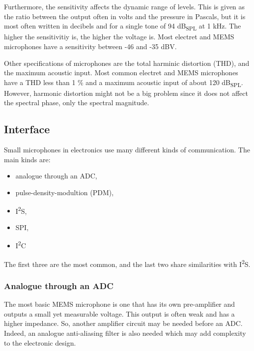 \documentclass[notitlepage]{report}
\begin{document}
Furthermore, the sensitivity affects the dynamic range of levels. This is given as the ratio between the output often in volts and the pressure in Pascals, but it is most often written in decibels and for a single tone of 94 \si{dB_{SPL}} at 1 \si{kHz}. The higher the sensitivitiy is, the higher the voltage is. Most electret and MEMS microphones have a sensitivity between -46 and -35 \si{dBV}.


Other specifications of microphones are the total harminic distortion (THD), and the maximum acoustic input. Most common electret and MEMS microphones have a THD  less than 1 \% and a maximum acoustic input of about 120 \si{dB_{SPL}}. However, harmonic distortion might not be a big problem since it does not affect the spectral phase, only the spectral magnitude.

\subsection{Interface}

Small microphones in electronics use many different kinds of communication. The main kinds are:
\begin{itemize}
	\item analogue through an ADC,
	\item pulse-density-modultion (PDM),
	\item I\textsuperscript{2}S, 
	\item SPI,
	\item I\textsuperscript{2}C
\end{itemize}

The first three are the most common, and the last two share similarities with I\textsuperscript{2}S.

\subsubsection{Analogue through an ADC}

The most basic MEMS microphone is one that has its own pre-amplifier and outputs a small yet measurable voltage. This output is often weak and has a higher impedance. So, another amplifier circuit may be needed before an ADC. Indeed, an analogue anti-aliasing filter is also needed which may add complexity to the electronic design.
\end{document}
